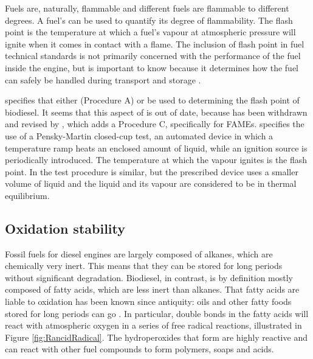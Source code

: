 Fuels are, naturally, flammable and different fuels are flammable to different
degrees. A fuel's  can be used to quantify its degree of
flammability. The flash point is the temperature at which a fuel's vapour at
atmospheric pressure will ignite when it comes in contact with a flame. The
inclusion of flash point in fuel technical standards is not primarily concerned
with the performance of the fuel inside the engine, but is important to know
because it determines how the fuel can safely be handled during transport and
storage \autocite{WFCC2009}.

 specifies that either  (Procedure A) or  be used to determining the flash point of biodiesel. It seems that this
aspect of  is out of date, because  has been
withdrawn and revised by , which adds a Procedure C,
specifically for FAMEs.  specifies the use of a Pensky-Martin
closed-cup test, an automated device in which a temperature ramp heats an
enclosed amount of liquid, while an ignition source is periodically introduced.
The temperature at which the vapour ignites is the flash point. In  the test procedure is similar, but the prescribed device uses a smaller
volume of liquid and the liquid and its vapour are considered to be in thermal
equilibrium.

\subsection{Oxidation stability}
\label{sec:Rancimat}

Fossil fuels for diesel engines are largely composed of alkanes, which are
chemically very inert. This means that they can be stored for long periods
without significant degradation. Biodiesel, in contrast, is by definition
\autocite[Paragraph 4.1.1]{SANS1935} mostly composed of fatty acids, which are
less inert than alkanes. That fatty acids are liable to oxidation has been known
since antiquity: oils and other fatty foods stored for long periods can go
. In particular, double bonds in the fatty acids will react with
atmospheric oxygen \autocite{Velasco2010} in a series of free radical reactions,
illustrated in Figure \ref{fig:RancidRadical}. The hydroperoxides that form are
highly reactive and can react with other fuel compounds to form polymers, soaps
and acids.

